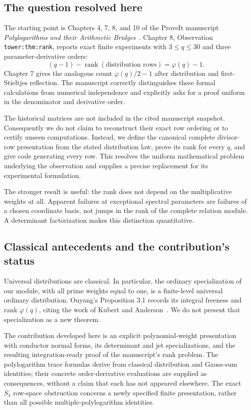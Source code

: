 \documentclass[11pt]{article}
\numberwithin{equation}{section}
\theoremstyle{definition}
\theoremstyle{remark}
\DeclareMathOperator{\rank}{rank}
\newcommand{\code}[1]{\texttt{\small #1}}
\begin{document}
\subsection{The question resolved here}
The starting point is Chapters 4, 7, 8, and 10 of the ProveIt manuscript
\emph{Polylogarithms and their Arithmetic Bridges}~\cite{repo}.
Chapter 8, Observation \code{tower:thm:rank}, reports exact finite
experiments with $3\le q\le30$ and three parameter-derivative orders:
\begin{equation}\label{eq:source-rank}
(q-1)-\rank(\text{distribution rows})=\varphi(q)-1.
\end{equation}
Chapter 7 gives the analogous count $\varphi(q)/2-1$ after distribution
and first-Stieltjes reflection. The manuscript correctly distinguishes
these formal calculations from numerical independence and explicitly
asks for a proof uniform in the denominator and derivative order.

The historical matrices are not included in the cited manuscript
snapshot. Consequently we do not claim to reconstruct their exact row
ordering or to certify unseen computations. Instead, we define the
canonical complete divisor-row presentation from the stated distribution
law, prove its rank for every $q$, and give code generating every row.
This resolves the uniform mathematical problem underlying the observation
and supplies a precise replacement for its experimental formulation.

The stronger result is useful: the rank does not depend on the
multiplicative weights at all. Apparent failures at exceptional spectral
parameters are failures of a chosen coordinate basis, not jumps in the
rank of the complete relation module. A determinant factorization makes
this distinction quantitative.

\subsection{Classical antecedents and the contribution's status}
Universal distributions are classical. In particular, the ordinary
specialization of our module, with all prime weights equal to one,
is a finite-level universal ordinary distribution. Ouyang's
Proposition 3.1 records its integral freeness and rank
$\varphi(q)$, citing the work of Kubert and Anderson~\cite{ouyang,kubert}.
We do not present that specialization as a new theorem.

The contribution developed here is an explicit polynomial-weight
presentation with conductor normal forms, its determinant and jet
specializations, and the resulting integration-ready proof of the
manuscript's rank problem. The polylogarithm trace formulas derive from
classical distribution and Gauss-sum identities; their concrete
order-derivative evaluations are supplied as consequences, without a
claim that each has not appeared elsewhere. The exact $S_4$ row-space
obstruction concerns a newly specified finite presentation, rather than
all possible multiple-polylogarithm identities.
\end{document}
